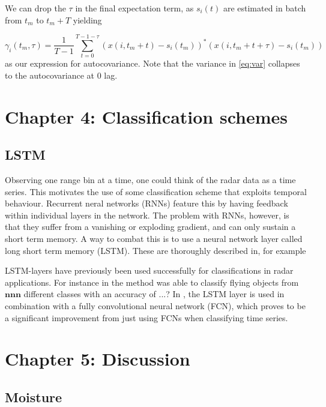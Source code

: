\documentclass[a4paper, 12pt]{article}
\begin{document}
We can drop the $\tau$ in the final expectation term, as $s_i(t)$ are estimated in batch from $t_m$ to  $t_m + T$ yielding

\begin{equation}
	\gamma_i(t_m, \tau) = \frac{1}{T-1}\sum_{t=0}^{T-1- \tau}(x(i, t_m + t) - s_i(t_m))^*(x(i, t_m + t + \tau) - s_i(t_m))
\end{equation}
as our expression for autocovariance. Note that the variance in \ref{eq:var} collapses to the autocovariance at 0 lag. 


\section{Chapter 4: Classification schemes}

\subsection{LSTM}
Observing one range bin at a time, one could think of the radar data as a time series. This motivates the use of some classification scheme that exploits temporal behaviour. Recurrent neral networks (RNNs) feature this by having feedback within individual layers in the network. \citep{karim_majumdar_darabi_chen_2018} The problem with RNNs, however, is that they suffer from a vanishing or exploding gradient, and can only sustain a short term memory. A way to combat this is to use a neural network layer called long short term memory (LSTM). These are thoroughly described in, for example \citep{hochreiter_schmidhuber_1997}

LSTM-layers have previously been used successfully for classifications in radar applications. For instance in \citep{jithesh_sagayaraj_srinivasa_2018} the method was able to classify flying objects from $\textbf{nnn}$ different classes with an accuracy of ...? In \citep{karim_majumdar_darabi_chen_2018}, the LSTM layer is used in combination with a fully convolutional neural network (FCN), which proves to be a significant improvement from just using FCNs when classifying time series.

\section{Chapter 5: Discussion}


\subsection{Moisture}
\end{document}
